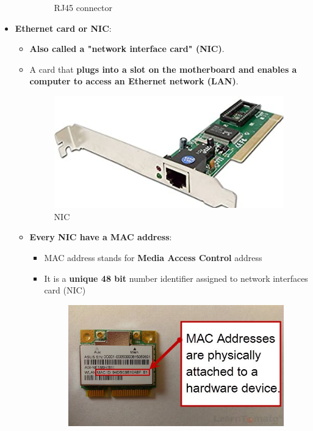 \begin{flushleft}
\begin{itemize}
\begin{itemize}
\begin{figure}[h!]
				\caption{RJ45 connector}
				\label{fig:network}
			\end{figure}
		\end{itemize}
		\newpage
		\item \textbf{Ethernet card or NIC}: 
		\begin{itemize}
			\item \textbf{Also called a "network interface card" (NIC)}.
			\item A card that \textbf{plugs into a slot on the motherboard and enables a computer to access an Ethernet network (LAN)}.
			\begin{figure}[h!]
				\centering
				\includegraphics[scale=0.25]{content/chapter14/images/ethernet.jpg}
				\caption{NIC}
				\label{fig:nic}
			\end{figure}
			\item \textbf{Every NIC have a MAC address}: 
			\begin{itemize}
				\item MAC address stands for \textbf{Media Access Control} address
				\item It is a \textbf{unique 48 bit} number identifier assigned to network interfaces card (NIC)
				\begin{figure}[h!]
					\centering
					\includegraphics[scale=0.3]{content/chapter14/images/mac.jpg}

\end{figure}
\end{itemize}
\end{itemize}
\end{itemize}
\end{flushleft}
